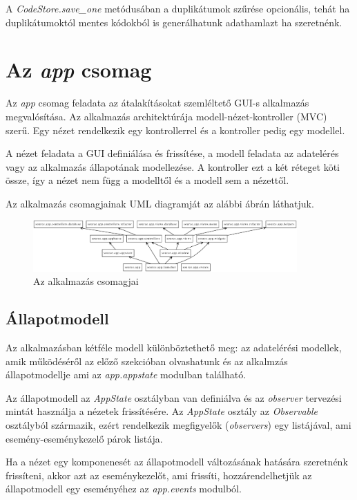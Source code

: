 A \emph{CodeStore.save\_one} metódusában a duplikátumok szűrése opcionális,
tehát ha duplikátumoktól mentes kódokból is generálhatunk adathamlazt ha szeretnénk.

\section{Az \emph{app} csomag}

Az \emph{app} csomag feladata az átalakításokat szemléltető GUI-s alkalmazás megvalósítása.
Az alkalmazás architektúrája modell-nézet-kontroller (MVC) szerű.
Egy nézet rendelkezik egy kontrollerrel és a kontroller pedig egy modellel.

A nézet feladata a GUI definiálása és frissítése,
a modell feladata az adatelérés vagy az alkalmazás állapotának modellezése.
A kontroller ezt a két réteget köti össze,
így a nézet nem függ a modelltől és a modell sem a nézettől.

Az alkalmazás csomagjainak UML diagramját az alábbi ábrán láthatjuk.

\begin{figure}[H]
	\centering
	\includegraphics[width=0.9\textwidth]{images/uml/apppackages.eps}
	\caption{Az alkalmazás csomagjai}
\end{figure}

\subsection{Állapotmodell}
\label{subsec:appstate}

Az alkalmazásban kétféle modell különböztethető meg:
az adatelérési modellek, amik működéséről az előző szekcióban olvashatunk
és az alkalmzás állapotmodellje ami az \emph{app.appstate} modulban található.

Az állapotmodell az \emph{AppState} osztályban van definiálva és 
az \emph{observer} tervezési mintát használja a nézetek frissítésére.
Az \emph{AppState} osztály az \emph{Observable} osztályból származik,
ezért rendelkezik megfigyelők (\emph{observers}) egy listájával,
ami esemény-eseménykezelő párok listája.

Ha a nézet egy komponenesét az állapotmodell változásának hatására szeretnénk frissíteni,
akkor azt az eseménykezelőt, ami frissíti, hozzárendelhetjük az állapotmodell egy
eseményéhez az \emph{app.events} modulból.

